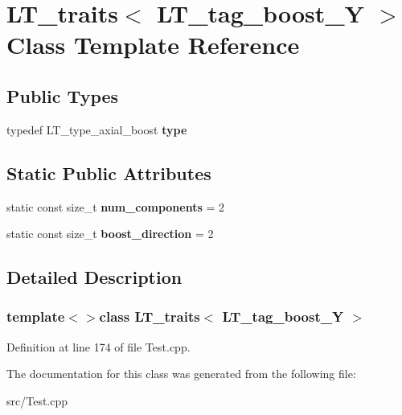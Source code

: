 \hypertarget{classLT__traits_3_01LT__tag__boost__Y_01_4}{}\section{L\+T\+\_\+traits$<$ L\+T\+\_\+tag\+\_\+boost\+\_\+\+Y $>$ Class Template Reference}
\label{classLT__traits_3_01LT__tag__boost__Y_01_4}
\subsection*{Public Types}
\begin{DoxyCompactItemize}
\item 
\hypertarget{classLT__traits_3_01LT__tag__boost__Y_01_4_a8c3a0838df99a944d415c6738ce753e0}{}typedef L\+T\+\_\+type\+\_\+axial\+\_\+boost {\bfseries type}\label{classLT__traits_3_01LT__tag__boost__Y_01_4_a8c3a0838df99a944d415c6738ce753e0}

\end{DoxyCompactItemize}
\subsection*{Static Public Attributes}
\begin{DoxyCompactItemize}
\item 
\hypertarget{classLT__traits_3_01LT__tag__boost__Y_01_4_a0ae10e0f922fb51151f62ef5ce15f01a}{}static const size\+\_\+t {\bfseries num\+\_\+components} = 2\label{classLT__traits_3_01LT__tag__boost__Y_01_4_a0ae10e0f922fb51151f62ef5ce15f01a}

\item 
\hypertarget{classLT__traits_3_01LT__tag__boost__Y_01_4_afef312cd684406e1ce8d750bba0c1c8d}{}static const size\+\_\+t {\bfseries boost\+\_\+direction} = 2\label{classLT__traits_3_01LT__tag__boost__Y_01_4_afef312cd684406e1ce8d750bba0c1c8d}

\end{DoxyCompactItemize}


\subsection{Detailed Description}
\subsubsection*{template$<$$>$class L\+T\+\_\+traits$<$ L\+T\+\_\+tag\+\_\+boost\+\_\+\+Y $>$}



Definition at line 174 of file Test.\+cpp.



The documentation for this class was generated from the following file\+:\begin{DoxyCompactItemize}
\item 
src/Test.\+cpp\end{DoxyCompactItemize}
